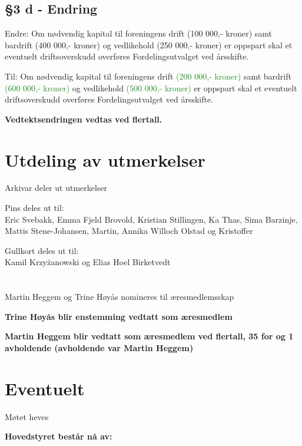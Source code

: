 \documentclass[10pt,norsk,a4paper,usenames,dvipsnames]{article}
\begin{document}
    \subsection{§3 d - Endring}
    Endre: 
    Om nødvendig kapital til foreningens drift \textcolor{BrickRed}{(100 000,- kroner)} samt bardrift \textcolor{BrickRed}{(400 000,- kroner)} og vedlikehold \textcolor{BrickRed}{(250 000,- kroner)} er oppspart skal et eventuelt driftsoverskudd overføres Fordelingsutvalget ved årsskifte. 
    
    Til: 
    Om nødvendig kapital til foreningens drift \textcolor{ForestGreen}{(200 000,- kroner)} samt bardrift \textcolor{ForestGreen}{(600 000,- kroner)} og vedlikehold \textcolor{ForestGreen}{(500 000,- kroner)} er oppspart skal et eventuelt driftsoverskudd overføres Fordelingsutvalget ved årsskifte. 

    \textbf{Vedtektsendringen vedtas ved flertall.}

\section{Utdeling av utmerkelser}

Arkivar deler ut utmerkelser

Pins deles ut til: \\
Eric Svebakk,
Emma Fjeld Brovold,
Kristian Stillingen,  
Ka Thas, 
Sima Barzinje, 
Mattis Stene-Johansen, 
Martin, 
Annika Willoch Olstad og 
Kristoffer 

Gullkort deles ut til: \\
Kamil Krzyżanowski og
Elias Hoel Birketvedt
\\\\\\
Martin Heggem og Trine Høyås nomineres til æresmedlemsskap 

\textbf{Trine Høyås blir enstemming vedtatt som æresmedlem} 

\textbf{Martin Heggem blir vedtatt som æresmedlem ved flertall, 35 for og 1 avholdende (avholdende var Martin Heggem)} 


\section{Eventuelt}

Møtet heves

\newpage

\textbf{\huge{Hovedstyret består nå av:}}

\mbox{}
\end{document}
